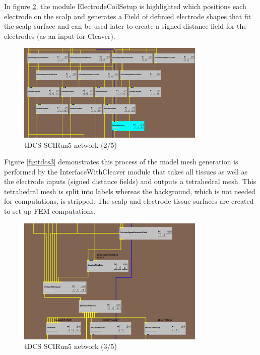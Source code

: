 \documentclass[fleqn,11pt,openany]{book}
\begin{document}
In figure \ref{fig:tdcs2}, the module ElectrodeCoilSetup is highlighted which positions each electrode on the scalp and generates a Field of definied electrode 
shapes that fit the scalp surface and can be used later to create a signed distance field for the electrodes (as an input for Cleaver). 


\begin{figure}[!h]
\centering
\includegraphics[width=0.8\textwidth]{BrainStimulation_figures/tdcs_2.png}
\caption{ tDCS SCIRun5 network (2/5)}
\label{fig:tdcs2}
\end{figure}

Figure \ref{fig:tdcs3} demonstrates this process of the model mesh generation is performed by the InterfaceWithCleaver module that takes all tissues as well as
the electrode inputs (signed distance fields) and outputs a tetrahedral mesh. This tetrahedral mesh is split into labels whereas the background,
which is not needed for computations, is stripped. The scalp and electrode tissue surfaces are created to set up FEM computations.

\begin{figure}[!h]
\centering
\includegraphics[width=0.8\textwidth]{BrainStimulation_figures/tdcs_3.png}
\caption{ tDCS SCIRun5 network (3/5)}
\label{fig:tdcs2}
\end{figure}
\end{document}
